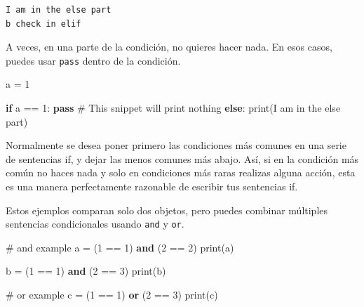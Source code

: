 \documentclass[
  letterpaper,
]{scrbook}
\newenvironment{Shaded}{\begin{snugshade}}{\end{snugshade}}
\newcommand{\BuiltInTok}[1]{\textcolor[rgb]{0.00,0.23,0.31}{#1}}
\newcommand{\CommentTok}[1]{\textcolor[rgb]{0.37,0.37,0.37}{#1}}
\newcommand{\ControlFlowTok}[1]{\textcolor[rgb]{0.00,0.23,0.31}{\textbf{#1}}}
\newcommand{\DecValTok}[1]{\textcolor[rgb]{0.68,0.00,0.00}{#1}}
\newcommand{\KeywordTok}[1]{\textcolor[rgb]{0.00,0.23,0.31}{\textbf{#1}}}
\newcommand{\NormalTok}[1]{\textcolor[rgb]{0.00,0.23,0.31}{#1}}
\newcommand{\OperatorTok}[1]{\textcolor[rgb]{0.37,0.37,0.37}{#1}}
\newcommand{\StringTok}[1]{\textcolor[rgb]{0.13,0.47,0.30}{#1}}
\begin{document}
\begin{verbatim}
I am in the else part
b check in elif
\end{verbatim}

A veces, en una parte de la condición, no quieres hacer nada. En esos
casos, puedes usar \texttt{pass} dentro de la condición.

\begin{Shaded}
\begin{Highlighting}[]
\NormalTok{a }\OperatorTok{=} \DecValTok{1}

\ControlFlowTok{if}\NormalTok{ a }\OperatorTok{==} \DecValTok{1}\NormalTok{:}
  \ControlFlowTok{pass} \CommentTok{\# This snippet will print nothing}
\ControlFlowTok{else}\NormalTok{:}
  \BuiltInTok{print}\NormalTok{(}\StringTok{\textquotesingle{}I am in the else part\textquotesingle{}}\NormalTok{)}
\end{Highlighting}
\end{Shaded}

Normalmente se desea poner primero las condiciones más comunes en una
serie de sentencias if, y dejar las menos comunes más abajo. Así, si en
la condición más común no haces nada y solo en condiciones más raras
realizas alguna acción, esta es una manera perfectamente razonable de
escribir tus sentencias if.

Estos ejemplos comparan solo dos objetos, pero puedes combinar múltiples
sentencias condicionales usando \texttt{and} y \texttt{or}.

\begin{Shaded}
\begin{Highlighting}[]
\CommentTok{\# and example}
\NormalTok{a }\OperatorTok{=}\NormalTok{ (}\DecValTok{1} \OperatorTok{==} \DecValTok{1}\NormalTok{) }\KeywordTok{and}\NormalTok{ (}\DecValTok{2} \OperatorTok{==} \DecValTok{2}\NormalTok{)}
\BuiltInTok{print}\NormalTok{(a)}

\NormalTok{b }\OperatorTok{=}\NormalTok{ (}\DecValTok{1} \OperatorTok{==} \DecValTok{1}\NormalTok{) }\KeywordTok{and}\NormalTok{ (}\DecValTok{2} \OperatorTok{==} \DecValTok{3}\NormalTok{)}
\BuiltInTok{print}\NormalTok{(b)}

\CommentTok{\# or example}
\NormalTok{c }\OperatorTok{=}\NormalTok{ (}\DecValTok{1} \OperatorTok{==} \DecValTok{1}\NormalTok{) }\KeywordTok{or}\NormalTok{ (}\DecValTok{2} \OperatorTok{==} \DecValTok{3}\NormalTok{)}
\BuiltInTok{print}\NormalTok{(c)}
\end{Highlighting}
\end{Shaded}
\end{document}
